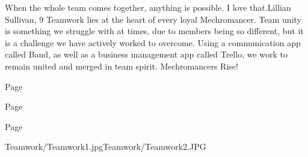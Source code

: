 {When the whole team comes together, anything is possible. I love that.}{Lillian Sullivan, 9}
{Teamwork lies at the heart of every loyal Mechromancer. Team unity is something we struggle with at times, due to members being so different, but it is a challenge we have actively worked to overcome. Using a communication app called Band, as well as a business management app called Trello, we work to remain united and merged in team spirit. Mechromancers Rise! }
{\item[$\blacksquare$] Page \pageref{teamwork:1}
 \item[$\blacksquare$] Page \pageref{committees:1}
 \item[$\blacksquare$] Page \pageref{connect:1}
 }
{Teamwork/Teamwork1.jpg}{Teamwork/Teamwork2.JPG}
